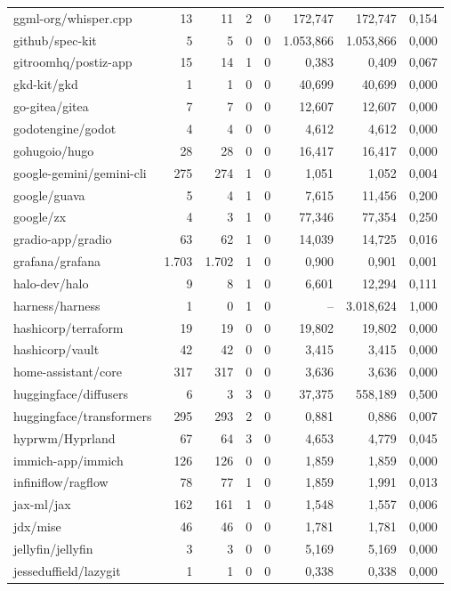 \begin{tabular}{lrrrrrrr}
ggml-org/whisper.cpp & 13 & 11 & 2 & 0 & 172,747 & 172,747 & 0,154 \\
github/spec-kit & 5 & 5 & 0 & 0 & 1.053,866 & 1.053,866 & 0,000 \\
gitroomhq/postiz-app & 15 & 14 & 1 & 0 & 0,383 & 0,409 & 0,067 \\
gkd-kit/gkd & 1 & 1 & 0 & 0 & 40,699 & 40,699 & 0,000 \\
go-gitea/gitea & 7 & 7 & 0 & 0 & 12,607 & 12,607 & 0,000 \\
godotengine/godot & 4 & 4 & 0 & 0 & 4,612 & 4,612 & 0,000 \\
gohugoio/hugo & 28 & 28 & 0 & 0 & 16,417 & 16,417 & 0,000 \\
google-gemini/gemini-cli & 275 & 274 & 1 & 0 & 1,051 & 1,052 & 0,004 \\
google/guava & 5 & 4 & 1 & 0 & 7,615 & 11,456 & 0,200 \\
google/zx & 4 & 3 & 1 & 0 & 77,346 & 77,354 & 0,250 \\
gradio-app/gradio & 63 & 62 & 1 & 0 & 14,039 & 14,725 & 0,016 \\
grafana/grafana & 1.703 & 1.702 & 1 & 0 & 0,900 & 0,901 & 0,001 \\
halo-dev/halo & 9 & 8 & 1 & 0 & 6,601 & 12,294 & 0,111 \\
harness/harness & 1 & 0 & 1 & 0 & -- & 3.018,624 & 1,000 \\
hashicorp/terraform & 19 & 19 & 0 & 0 & 19,802 & 19,802 & 0,000 \\
hashicorp/vault & 42 & 42 & 0 & 0 & 3,415 & 3,415 & 0,000 \\
home-assistant/core & 317 & 317 & 0 & 0 & 3,636 & 3,636 & 0,000 \\
huggingface/diffusers & 6 & 3 & 3 & 0 & 37,375 & 558,189 & 0,500 \\
huggingface/transformers & 295 & 293 & 2 & 0 & 0,881 & 0,886 & 0,007 \\
hyprwm/Hyprland & 67 & 64 & 3 & 0 & 4,653 & 4,779 & 0,045 \\
immich-app/immich & 126 & 126 & 0 & 0 & 1,859 & 1,859 & 0,000 \\
infiniflow/ragflow & 78 & 77 & 1 & 0 & 1,859 & 1,991 & 0,013 \\
jax-ml/jax & 162 & 161 & 1 & 0 & 1,548 & 1,557 & 0,006 \\
jdx/mise & 46 & 46 & 0 & 0 & 1,781 & 1,781 & 0,000 \\
jellyfin/jellyfin & 3 & 3 & 0 & 0 & 5,169 & 5,169 & 0,000 \\
jesseduffield/lazygit & 1 & 1 & 0 & 0 & 0,338 & 0,338 & 0,000 \\

\end{tabular}
